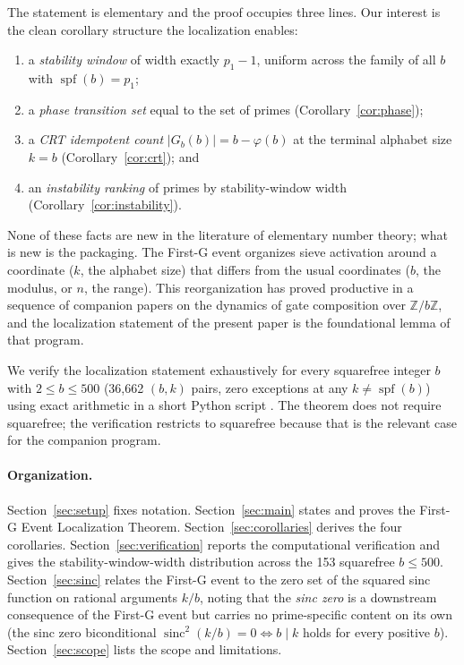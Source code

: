 \documentclass[11pt,reqno]{amsart}
\theoremstyle{definition}
\newcommand{\Z}{\mathbb{Z}}
\DeclareMathOperator{\spf}{spf}
\begin{document}
The statement is elementary and the proof occupies three lines. Our interest
is the clean corollary structure the localization enables:
\begin{enumerate}[label=(\alph*)]
\item a \emph{stability window} of width exactly $p_1 - 1$, uniform across
      the family of all $b$ with $\spf(b) = p_1$;
\item a \emph{phase transition set} equal to the set of primes
      (Corollary~\ref{cor:phase});
\item a \emph{CRT idempotent count} $|G_b(b)| = b - \varphi(b)$ at the
      terminal alphabet size $k = b$ (Corollary~\ref{cor:crt}); and
\item an \emph{instability ranking} of primes by stability-window width
      (Corollary~\ref{cor:instability}).
\end{enumerate}

None of these facts are new in the literature of elementary number theory;
what is new is the packaging. The First-G event organizes sieve activation
around a coordinate ($k$, the alphabet size) that differs from the usual
coordinates ($b$, the modulus, or $n$, the range). This reorganization has
proved productive in a sequence of companion papers \cite{WP34,WP35,WP101}
on the dynamics of gate composition over $\Z/b\Z$, and the localization
statement of the present paper is the foundational lemma of that program.

We verify the localization statement exhaustively for every squarefree
integer $b$ with $2 \le b \le 500$ (36{,}662 $(b,k)$ pairs, zero exceptions
at any $k \ne \spf(b)$) using exact arithmetic in a short Python script
\cite{proof}. The theorem does not require squarefree; the verification
restricts to squarefree because that is the relevant case for the companion
program.

\medskip

\paragraph*{Organization.} Section~\ref{sec:setup} fixes notation.
Section~\ref{sec:main} states and proves the First-G Event Localization
Theorem. Section~\ref{sec:corollaries} derives the four corollaries.
Section~\ref{sec:verification} reports the computational verification and
gives the stability-window-width distribution across the 153 squarefree
$b \le 500$. Section~\ref{sec:sinc} relates the First-G event to the zero
set of the squared sinc function on rational arguments $k/b$, noting that
the \emph{sinc zero} is a downstream consequence of the First-G event but
carries no prime-specific content on its own (the sinc zero biconditional
$\operatorname{sinc}^2(k/b) = 0 \iff b \mid k$ holds for every positive
$b$). Section~\ref{sec:scope} lists the scope and limitations.
\end{document}
